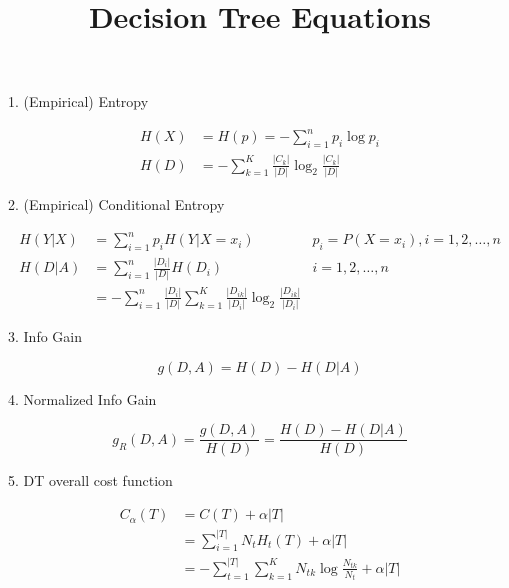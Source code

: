 \documentclass[12pt]{article}
\title{Decision Tree Equations}
\begin{document}
\maketitle

1. (Empirical) Entropy

\begin{align*}
  H(X) &= H(p) = -\sum_{i=1}^{n} p_i \log p_i \\
  H(D) &= -\sum_{k=1}^K \frac{|C_k|}{|D|} \log_2\frac{|C_k|}{|D|}
\end{align*}

2. (Empirical) Conditional Entropy


\begin{align*}
  H(Y|X)&=\sum_{i=1}^n p_i H(Y|X=x_i)  & p_i=P(X=x_i),i=1,2,\dots ,n \\
  H(D|A)&=\sum_{i=1}^n \frac{|D_i|}{|D|} H(D_i)  & i=1,2,\dots ,n \\
        &=-\sum_{i=1}^n \frac{|D_i|}{|D|} \sum_{k=1}^K \frac{|D_{ik}|}{|D_i|} \log_2\frac{|D_{ik}|}{|D_i|}
\end{align*}

3. Info Gain

$$ g(D,A) = H(D) - H(D|A) $$

4. Normalized Info Gain

$$
  g_R(D,A) = \frac {g(D, A)} {H(D)} = \frac {H(D) - H(D|A)} {H(D)}
$$

5. DT overall cost function


\begin{align*}
  C_\alpha(T) &= C(T) + \alpha|T| \\
    &=\sum_{i=1}^{|T|}N_tH_t(T)+\alpha|T| \\
    &=-\sum_{t=1}^{|T|}\sum_{k=1}^K N_{tk} \log\frac{N_{tk}}{N_t} + \alpha|T|
\end{align*}
\end{document}
